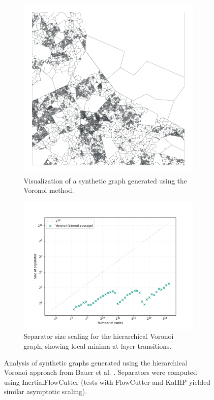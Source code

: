 \begin{figure}[tbhp]
	\centering
	\begin{subfigure}{0.35\linewidth}
		\centering
		\includegraphics[width=\linewidth]{graphics/voronoi.png}
		\caption{Visualization of a synthetic graph generated using the Voronoi method.}
		\label{fig:voronoi_hierarchy_viz}
	\end{subfigure}
	\hfill
	\begin{subfigure}{0.55\linewidth}
		\centering
		\includegraphics[width=\linewidth]{graphics/sep-voronoi.pdf}
		\caption{Separator size scaling for the hierarchical Voronoi graph, showing local minima at layer transitions.}
		\label{fig:voronoi_hierarchy_sep_plot}
	\end{subfigure}
	\caption{Analysis of synthetic graphs generated using the hierarchical Voronoi approach from Bauer et al. \cite{hutchison_synthetic_2010}. Separators were computed using InertialFlowCutter (tests with FlowCutter and KaHIP yielded similar asymptotic scaling).}
	\label{fig:voronoi_hierarchy}
\end{figure}


